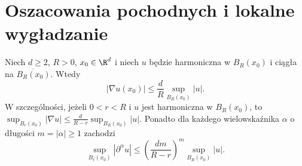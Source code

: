 \section{Oszacowania pochodnych i lokalne wygładzanie}
\label{sec:pde14-deriv}
\begin{twierdzenie}
\label{thm:pde14-gradient}
Niech $d\ge2$, $R>0$, $x_0\in\R^d$ i niech $u$ będzie
harmoniczna w $B_R(x_0)$ i ciągła na $\overline{B_R(x_0)}$.
Wtedy
\[
 |\nabla u(x_0)|\le \frac dR
 \sup_{B_R(x_0)}|u|.
\]
W szczególności, jeżeli $0<r<R$ i $u$ jest harmoniczna
w $B_R(x_0)$, to
$\sup_{B_r(x_0)}|\nabla u|\le
\frac{d}{R-r}\sup_{B_R(x_0)}|u|$.
Ponadto dla każdego wielowskaźnika $\alpha$ o długości
$m=|\alpha|\ge1$ zachodzi
\[
 \sup_{B_r(x_0)}|\partial^\alpha u|
 \le \left(\frac{dm}{R-r}\right)^m\sup_{B_R(x_0)}|u|.
\]
\end{twierdzenie}
